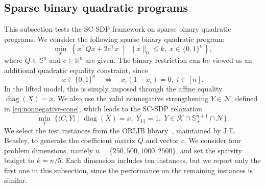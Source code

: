 \documentclass[11pt]{article}
\DeclareMathOperator{\diag}{diag}
\def\K{\mathcal{K}}
\def\R{\mathbb{R}}
\def\S{\mathbb{S}}
\theoremstyle{plain}
\begin{document}
\subsection{Sparse binary quadratic programs}\label{subsec:numexp-sbqp}
This subsection tests the SC-SDP framework on sparse binary quadratic programs. We consider the following sparse binary quadratic program:
\begingroup
\renewcommand{\theequation}{S-BIQ}
\begin{equation}\label{eq:sbqp-original}    
\min_{x}\;
\left\{
x^\top Q x + 2c^\top x
\;\middle|\;\|x\|_0\le k,\;  x\in\{0,1\}^n
\right\},\tag{S-BIQ}
\end{equation}
\endgroup
where $Q\in\S^n$ and $c\in\R^n$ are given. The binary restriction can be viewed as an additional quadratic equality constraint, since
\[
x\in \{0,1\}^n
\quad\Longleftrightarrow\quad
x_i(1-x_i)=0,\; i\in[n].
\]
In the lifted model, this is simply imposed through the affine equality \(\diag(X)=x\). We also use the valid nonnegative strengthening \(Y\in\mathcal N\), defined in \eqref{eq:nonnegative-cone}, which leads to the SC-SDP relaxation
\begin{equation}\label{eq:sbqp-SDP}
\min_{Y}\;
\Big\{
\langle C,Y\rangle
\;\Big|\; 
\diag(X)=x,\;
Y_{11}=1,\;
Y\in \K\cap \S_+^{n+1}\cap \mathcal{N}
\Big\}.
\end{equation}
We select the test instances from the ORLIB library~\cite{beasley1998heuristic}, maintained by J.E. Beasley, to generate the coefficient matrix $Q$ and vector $c$. We consider four problem dimensions, namely $n=\{250,500,1000,2500\}$, and set the sparsity budget to $k=n/5$. Each dimension includes ten instances, but we report only the first one in this subsection, since the performance on the remaining instances is similar. 
\end{document}
